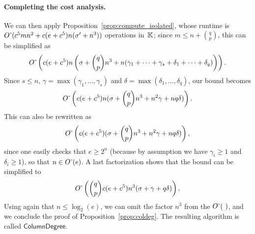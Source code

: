 \documentclass[12pt]{article}
\begin{document}
\paragraph{Completing the cost analysis.}
We can then apply Proposition~\ref{prop:compute_isolated},
whose runtime is ${O}{\,\tilde{ }\,}(c^5 m n^2  + c(e+c^5) n(\sigma' + n^3))$ operations
in~$\mathbb{K}$; since $m \le n + {q \choose p}$, this can be simplified as
$${O}{\,\tilde{ }\,}\left (c(e+c^5) n \left(\sigma + {q \choose p} n^3
+n(\gamma_1+\cdots+\gamma_s+\delta_1+\cdots+\delta_q)\right)\right).$$
Since $s \leq n$, $\gamma = \max(\gamma_1, \ldots, \gamma_s)$ and
$\delta = \max(\delta_1, \ldots, \delta_q)$, our bound becomes
$${O}{\,\tilde{ }\,}\left (c(e+c^5) n(\sigma + {q \choose p}n^3+n^2\gamma + nq
  \delta)\right).$$ This can also be rewritten as
$${O}{\,\tilde{ }\,}\left (c(e+c^5 )(\sigma + {q \choose p}n^3+n^2\gamma + nq
  \delta)\right),$$
since one easily checks that $e \ge 2^n$ (because by assumption we
have $\gamma_i\geq 1 $ and $\delta_i\geq 1$), so that
$n \in {O}{\,\tilde{ }\,}(e)$. A last factorization shows that the bound can be
simplified to
\[
  {O}{\,\tilde{ }\,}\left ({q \choose p}  c(e+c^5 )n^3(\sigma +\gamma + q
    \delta)\right).
\]
Using again  that $n\le\log_2(e)$, we can omit the factor
$n^3$ from the ${O}{\,\tilde{ }\,}(\ )$, and we conclude the proof of Proposition~\ref{prop:coldeg}.
The resulting algorithm is called $\mathsf{ColumnDegree}$.
\end{document}
